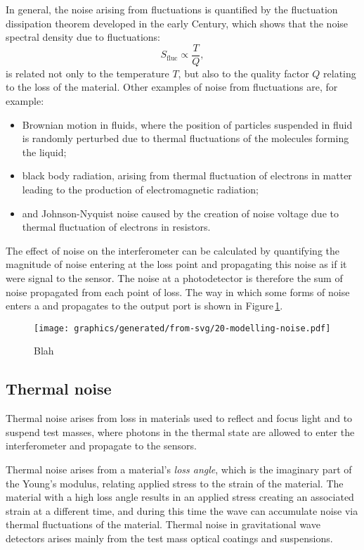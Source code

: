 In general, the noise arising from fluctuations is quantified by the fluctuation dissipation theorem developed in the early  Century, which shows that the noise spectral density due to fluctuations:
\begin{equation}
  S_{\text{fluc}} \propto \frac{T}{Q},
\end{equation}
is related not only to the temperature $T$, but also to the quality factor $Q$ relating to the loss of the material. Other examples of noise from fluctuations are, for example:
\begin{itemize}
  \item Brownian motion in fluids, where the position of particles suspended in fluid is randomly perturbed due to thermal fluctuations of the molecules forming the liquid;
  \item black body radiation, arising from thermal fluctuation of electrons in matter leading to the production of electromagnetic radiation;
  \item and Johnson-Nyquist noise caused by the creation of noise voltage due to thermal fluctuation of electrons in resistors.
\end{itemize}

The effect of noise on the interferometer can be calculated by quantifying the magnitude of noise entering at the loss point and propagating this noise as if it were signal to the sensor. The noise at a photodetector is therefore the sum of noise propagated from each point of loss. The way in which some forms of noise enters a \DRFPMI{} and propagates to the output port is shown in Figure\,\ref{fig:modelling-noise}.

\begin{figure}
  \centering
  \texttt{[image: graphics/generated/from-svg/20-modelling-noise.pdf]}
  \caption[Modelling noise]{\label{fig:modelling-noise}Blah}
\end{figure}

\subsection{Thermal noise}
Thermal noise arises from loss in materials used to reflect and focus light and to suspend test masses, where photons in the thermal state are allowed to enter the interferometer and propagate to the sensors.

Thermal noise arises from a material's \emph{loss angle}, which is the imaginary part of the Young's modulus, relating applied stress to the strain of the material. The material with a high loss angle results in an applied stress creating an associated strain at a different time, and during this time the wave can accumulate noise via thermal fluctuations of the material. Thermal noise in gravitational wave detectors arises mainly from the test mass optical coatings and suspensions.

